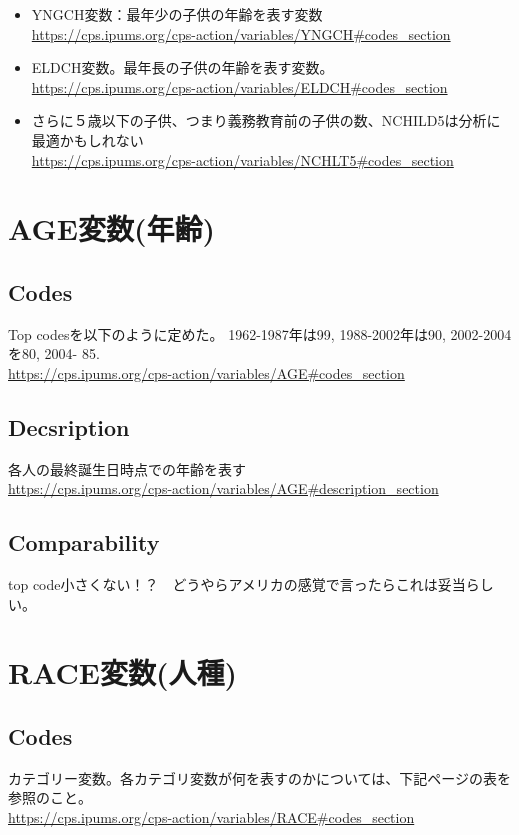\documentclass{jsarticle}
\begin{document}
\begin{itemize}
    \item YNGCH変数：最年少の子供の年齢を表す変数\\
    \url{https://cps.ipums.org/cps-action/variables/YNGCH#codes_section}
    
    \item ELDCH変数。最年長の子供の年齢を表す変数。\\
    \url{https://cps.ipums.org/cps-action/variables/ELDCH#codes_section}
    
    \item さらに５歳以下の子供、つまり義務教育前の子供の数、NCHILD5は分析に最適かもしれない\\
    \url{https://cps.ipums.org/cps-action/variables/NCHLT5#codes_section}
\end{itemize}

\section{AGE変数(年齢)}
\subsection{Codes}
Top codesを以下のように定めた。
1962-1987年は99, 1988-2002年は90, 2002-2004を80, 2004- 85.\\
\url{https://cps.ipums.org/cps-action/variables/AGE#codes_section}

\subsection{Decsription}
各人の最終誕生日時点での年齢を表す\\
\url{https://cps.ipums.org/cps-action/variables/AGE#description_section}

\subsection{Comparability}
top code小さくない！？　どうやらアメリカの感覚で言ったらこれは妥当らしい。

\section{RACE変数(人種)}
\subsection{Codes}
カテゴリー変数。各カテゴリ変数が何を表すのかについては、下記ページの表を参照のこと。\\
\url{https://cps.ipums.org/cps-action/variables/RACE#codes_section}
\end{document}
